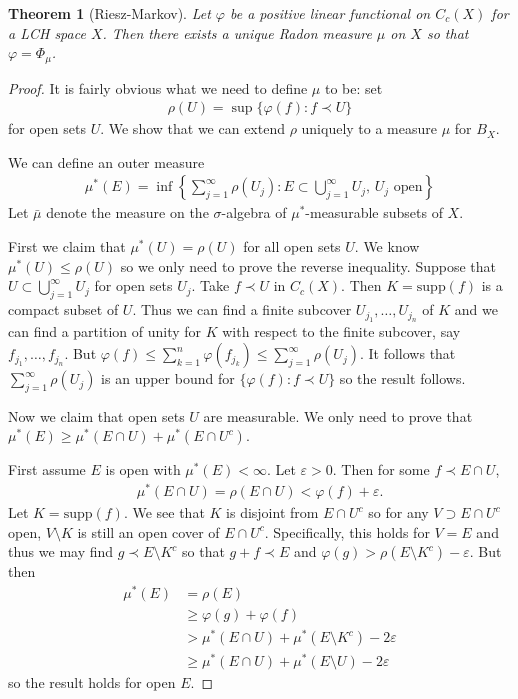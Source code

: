 \documentclass[11pt]{amsart}
\newtheorem{theorem}{Theorem}[section]
\theoremstyle{definition}
\numberwithin{equation}{section}
\begin{document}
\begin{theorem}[Riesz-Markov]
    Let $\varphi$ be a positive linear functional on $C_c(X)$ for a LCH space $X$. Then there exists a unique Radon measure $\mu$ on $X$ so that $\varphi=\Phi_\mu$.
\end{theorem}
\begin{proof}
    It is fairly obvious what we need to define $\mu$ to be: set
    \begin{align*}
        \rho(U)=\sup\{\varphi(f):f\prec U\}
    \end{align*}
    for open sets $U$. We show that we can extend $\rho$ uniquely to a measure $\mu$ for $B_X$.

    We can define an outer measure
    \begin{align*}
        \mu^*(E)=\inf\left\{\sum_{j=1}^\infty\rho(U_j):E\subset\bigcup_{j=1}^\infty U_j,\,U_j\text{ open}\right\}
    \end{align*}
    Let $\bar \mu$ denote the measure on the $\sigma$-algebra of $\mu^*$-measurable subsets of $X$. 

    First we claim that $\mu^*(U)=\rho(U)$ for all open sets $U$. We know $\mu^*(U)\le\rho(U)$ so we only need to prove the reverse inequality. Suppose that $U\subset \bigcup_{j=1}^\infty U_j$ for open sets $U_j$. Take $f\prec U$ in $C_c(X)$. Then $K=\mathrm{supp}(f)$ is a compact subset of $U$. Thus we can find a finite subcover $U_{j_1},\ldots,U_{j_n}$ of $K$ and we can find a partition of unity for $K$ with respect to the finite subcover, say $f_{j_1},\ldots,f_{j_n}$. But $\varphi(f)\le\sum_{k=1}^n\varphi(f_{j_k})\le\sum_{j=1}^\infty\rho(U_j)$. It follows that $\sum_{j=1}^\infty\rho(U_j)$ is an upper bound for $\{\varphi(f):f\prec U\}$ so the result follows.

    Now we claim that open sets $U$ are measurable. We only need to prove that $\mu^*(E)\ge\mu^*(E\cap U)+\mu^*(E\cap U^c)$.

    First assume $E$ is open with $\mu^*(E)<\infty$. Let $\varepsilon>0$. Then for some $f\prec E\cap U$, 
    \begin{align*}
        \mu^*(E\cap U)=\rho(E\cap U)<\varphi(f)+\varepsilon.
    \end{align*}
    Let $K=\mathrm{supp}(f)$. We see that $K$ is disjoint from $E\cap U^c$ so for any $V\supset E\cap U^c$ open, $V\setminus K$ is still an open cover of $E\cap U^c$. Specifically, this holds for $V=E$ and thus we may find $g\prec E\setminus K^c$ so that $g+f\prec E$ and $\varphi(g)>\rho(E\setminus K^c)-\varepsilon$. But then 
    \begin{align*}
        \mu^*(E)&=\rho(E)\\
        &\ge\varphi(g)+\varphi(f)\\
        &>\mu^*(E\cap U)+\mu^*(E\setminus K^c)-2\varepsilon\\
        &\ge\mu^*(E\cap U)+\mu^*(E\setminus U)-2\varepsilon
    \end{align*}
    so the result holds for open $E$.


\end{proof}
\end{document}
